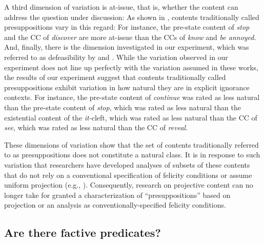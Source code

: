 \documentclass[11pt,fleqn]{article}
\newcommand{\6}{\mbox{$[\hspace*{-.6mm}[$}}
\newcommand{\9}{\mbox{$]\hspace*{-.6mm}]$}}
\begin{document}
A third dimension of variation is at-issue, that is, whether the content can address the question under discussion: As shown in \citealt{tbd-variability}, contents traditionally called presuppositions vary in this regard: For instance, the pre-state content of {\em stop} and the CC of {\em discover} are more at-issue than the CCs of {\em know} and {\em be annoyed}. And, finally, there is the dimension investigated in our experiment, which was referred to as defeasibility by \citealt{simons01} and \citealt{abusch10}. While the variation observed in our experiment does not line up perfectly with the variation assumed in these works, the results of our experiment suggest that contents traditionally called presuppositions exhibit variation in how natural they are in explicit ignorance contexts. For instance,  the pre-state content of {\em continue} was rated as less natural than the pre-state content of {\em stop}, which was rated as less natural than the existential content of the {\em it-}cleft, which was rated as less natural than the CC of {\em see}, which was rated as less natural than the CC of {\em reveal}. 

These dimensions of variation show that the set of contents traditionally referred to as presuppositions does not constitute a natural class. It is in response to such variation that researchers have developed analyses of subsets of these contents that do not rely on a conventional specification of felicity conditions or assume uniform projection (e.g., \citealt{abrusan2011,abrusan2013,abrusan2016,abusch02,abusch10,romoli2015}). Consequently, research on projective content can no longer take for granted a characterization of ``presuppositions''  based on projection or an analysis as conventionally-specified felicity conditions.

\subsection{Are there factive predicates?}
\end{document}
